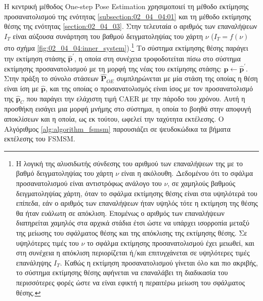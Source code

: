 Η κεντρική μέθοδος One-step Pose Estimation χρησιμοποιεί τη μέθοδο εκτίμησης
προσανατολισμού της ενότητας \ref{subsection:02_04_04:01} και τη μέθοδο
εκτίμησης θέσης της ενότητας \ref{section:02_04_03}.  Στην τελευταία ο αριθμός
των επαναλήψεων $I_T$ είναι αύξουσα συνάρτηση του βαθμού δειγματοληψίας του
χάρτη $\nu$ ($I_T = f(\nu)$ στο σχήμα
\ref{fig:02_04_04:inner_system}).\footnote{Η λογική της αλυσιδωτής σύνδεσης του
αριθμού των επαναλήψεων της με το βαθμό δειγματοληψίας του χάρτη $\nu$ είναι η
ακόλουθη. Δεδομένου ότι το σφάλμα προσανατολισμού είναι αντιστρόφως ανάλογο του
$\nu$, σε χαμηλούς βαθμούς δειγματοληψίας χάρτη, όταν το σφάλμα εκτίμησης θέσης
είναι στα υψηλότερά του επίπεδα, εάν ο αριθμός των επαναλήψεων ήταν υψηλός τότε
η εκτίμηση της θέσης θα ήταν ευάλωτη σε απόκλιση.  Επομένως ο αριθμός των
επαναλήψεων διατηρείται χαμηλός στα αρχικά στάδια έτσι ώστε να υπάρχει
ισορροπία μεταξύ της μείωσης του σφάλματος θέσης και της απόκλισης της
εκτίμησης θέσης. Σε υψηλότερες τιμές του $\nu$ το σφάλμα εκτίμησης
προσανατολισμού έχει μειωθεί, και στη συνέχεια η απόκλιση περιορίζεται ή/και
επιτυγχάνεται σε υψηλότερες τιμές επανάληψης $I_T$. Καθώς η εκτίμηση
προσανατολισμού γίνεται όλο και πιο ακριβής, το σύστημα εκτίμησης θέσης
αφήνεται να επαναλάβει τη διαδικασία του περισσότερες φορές ώστε να είναι
εφικτή η περαιτέρω μείωση του σφάλματος θέσης.} Το σύστημα εκτίμησης θέσης
παράγει την εκτίμηση στάσης $\hat{\bm{p}}^\prime$, η οποία στη συνέχεια
τροφοδοτείται πίσω στο σύστημα εκτίμησης προσανατολισμού με τη μορφή της νέας
του εκτίμησης στάσης: $\hat{\bm{p}} \leftarrow \hat{\bm{p}}^\prime$. Στην
πράξη το σύνολο στάσεων $\hat{\bm{P}}_{OE}$ συμπληρώνεται με μία στάση της
οποίας η θέση είναι ίση με $\hat{\bm{p}}$, και της οποίας ο προσανατολισμός
είναι ίσος με τον προσανατολισμό της $\hat{\bm{p}}_C$ που παράγει την ελάχιστη
τιμή CAER με την πάροδο του χρόνου. Αυτή η προσθήκη εισάγει μια μορφή μνήμης
στο σύστημα, η οποία το βοηθά στην αποφυγή αποκλίσεων και η οποία, ως εκ
τούτου, ωφελεί την ταχύτητα εκτέλεσης. Ο Αλγόριθμος \ref{alg:algorithm_fsmsm}
παρουσιάζει σε ψευδοκώδικα τα βήματα εκτέλεσης του FSMSM.

